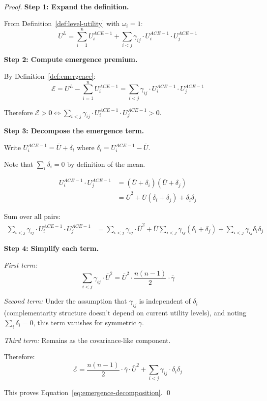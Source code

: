 \begin{proof}
\textbf{Step 1: Expand the definition.}

From Definition~\ref{def:level-utility} with $\omega_i = 1$:
\begin{equation}
U^L = \sum_{i=1}^{n} U^{ACE-1}_i + \sum_{i<j} \gamma_{ij} \cdot U^{ACE-1}_i \cdot U^{ACE-1}_j
\end{equation}

\textbf{Step 2: Compute emergence premium.}

By Definition~\ref{def:emergence}:
\begin{equation}
\mathcal{E} = U^L - \sum_{i=1}^{n} U^{ACE-1}_i = \sum_{i<j} \gamma_{ij} \cdot U^{ACE-1}_i \cdot U^{ACE-1}_j
\end{equation}

Therefore $\mathcal{E} > 0 \Leftrightarrow \sum_{i<j} \gamma_{ij} \cdot U^{ACE-1}_i \cdot U^{ACE-1}_j > 0$. \checkmark

\textbf{Step 3: Decompose the emergence term.}

Write $U^{ACE-1}_i = \bar{U} + \delta_i$ where $\delta_i = U^{ACE-1}_i - \bar{U}$.

Note that $\sum_i \delta_i = 0$ by definition of the mean.

\begin{align}
U^{ACE-1}_i \cdot U^{ACE-1}_j &= (\bar{U} + \delta_i)(\bar{U} + \delta_j) \\
&= \bar{U}^2 + \bar{U}(\delta_i + \delta_j) + \delta_i \delta_j
\end{align}

Sum over all pairs:
\begin{align}
\sum_{i<j} \gamma_{ij} \cdot U^{ACE-1}_i \cdot U^{ACE-1}_j &=
\sum_{i<j} \gamma_{ij} \cdot \bar{U}^2 +
\bar{U} \sum_{i<j} \gamma_{ij} (\delta_i + \delta_j) +
\sum_{i<j} \gamma_{ij} \delta_i \delta_j
\end{align}

\textbf{Step 4: Simplify each term.}

\textit{First term:}
\begin{equation}
\sum_{i<j} \gamma_{ij} \cdot \bar{U}^2 = \bar{U}^2 \cdot \frac{n(n-1)}{2} \cdot \bar{\gamma}
\end{equation}

\textit{Second term:} Under the assumption that $\gamma_{ij}$ is independent of $\delta_i$
(complementarity structure doesn't depend on current utility levels), and noting
$\sum_i \delta_i = 0$, this term vanishes for symmetric $\gamma$.

\textit{Third term:} Remains as the covariance-like component.

Therefore:
\begin{equation}
\mathcal{E} = \frac{n(n-1)}{2} \cdot \bar{\gamma} \cdot \bar{U}^2 + \sum_{i<j} \gamma_{ij} \cdot \delta_i \delta_j
\end{equation}

This proves Equation~\ref{eq:emergence-decomposition}. \qed
\end{proof}


